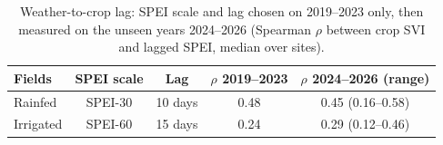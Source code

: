 \begin{table}[H]
\centering
\caption{Weather-to-crop lag: SPEI scale and lag chosen on 2019--2023 only, then measured on the unseen years 2024--2026 (Spearman $\rho$ between crop SVI and lagged SPEI, median over sites).}
\label{tab:s_lag}
\footnotesize
\begin{tabular}{@{}lcccc@{}}
\toprule
\textbf{Fields} & \textbf{SPEI scale} & \textbf{Lag} & \textbf{$\rho$ 2019--2023} & \textbf{$\rho$ 2024--2026 (range)} \\
\midrule
Rainfed & SPEI-30 & 10 days & 0.48 & 0.45 (0.16--0.58) \\
Irrigated & SPEI-60 & 15 days & 0.24 & 0.29 (0.12--0.46) \\
\bottomrule
\end{tabular}
\end{table}
